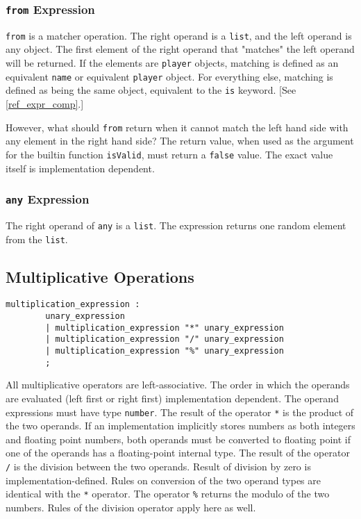 \subsubsection{\texttt{from} Expression}
\texttt{from} is a matcher operation. The right operand is a
\texttt{list}, and the left operand is any object. The first element
of the right operand that "matches" the left operand will be
returned. If the elements are \texttt{player} objects, matching is
defined as an equivalent \texttt{name} or equivalent \texttt{player}
object. For everything else, matching is defined as being the same
object, equivalent to the \texttt{is} keyword. [See \ref{ref_expr_comp}.]

However, what should \texttt{from} return when it cannot match the
left hand side with any element in the right hand side? The return
value, when used as the argument for the builtin function
\texttt{isValid}, must return a \texttt{false} value. The exact value
itself is implementation dependent.

\subsubsection{\texttt{any} Expression}
The right operand of \texttt{any} is a \texttt{list}. The expression returns one random element from the \texttt{list}.

\subsection{Multiplicative Operations}\label{multiplication}
\begin{verbatim}
multiplication_expression : 
        unary_expression
        | multiplication_expression "*" unary_expression
        | multiplication_expression "/" unary_expression
        | multiplication_expression "%" unary_expression
        ;
\end{verbatim}

All multiplicative operators are left-associative. The order in which the operands are evaluated (left first or right first) implementation dependent. The operand expressions must have type \texttt{number}. The result of the operator \texttt{*} is the product of the two operands. If an implementation implicitly stores numbers as both integers and floating point numbers, both operands must be converted to floating point if one of the operands has a floating-point internal type.
The result of the operator \texttt{/} is the division between the two operands. Result of division by zero is implementation-defined. Rules on conversion of the two operand types are identical with the \texttt{*} operator.
The operator \texttt{\%} returns the modulo of the two numbers. Rules of the division operator apply here as well.

